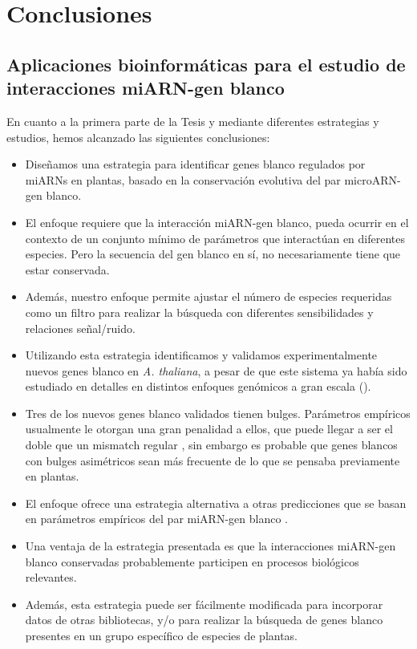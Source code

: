 \setcounter{chapter}{8}
\chapter*{Conclusiones} 
\setcounter{figure}{0}
\setcounter{section}{0}


\graphicspath{{Chapter2/Figs/}}


\section{Aplicaciones bioinformáticas para el estudio de interacciones miARN-gen blanco}

En cuanto a la primera parte de la Tesis y mediante diferentes estrategias y estudios, hemos alcanzado las siguientes conclusiones:

\begin{itemize}
    \item Diseñamos una estrategia para identificar genes blanco regulados por miARNs en plantas, basado en la conservación evolutiva del par microARN-gen blanco.
    \item El enfoque requiere que la interacción miARN-gen blanco, pueda ocurrir en el contexto de un conjunto mínimo de parámetros que interactúan en diferentes especies. Pero la secuencia del gen blanco en sí, no necesariamente tiene que estar conservada.
    \item Además, nuestro enfoque permite ajustar el número de especies requeridas como un filtro para realizar la búsqueda con diferentes sensibilidades y relaciones señal/ruido.
    \item Utilizando esta estrategia identificamos y validamos experimentalmente nuevos genes blanco en \textit{A. thaliana}, a pesar de que este sistema ya había sido estudiado en detalles en distintos enfoques genómicos a gran escala (\citep{Allen2005207,JonesRhoades2004787,Addo-quaye2009a,German2008,Rajagopalan2006,Schwab2005517}).
    \item Tres de los nuevos genes blanco validados tienen bulges. Parámetros empíricos usualmente le otorgan una gran penalidad a ellos, que puede llegar a ser el doble que un mismatch regular \citep{JonesRhoades2004787}, 
    sin embargo es probable que genes blancos con bulges asimétricos sean más frecuente de lo que se pensaba previamente en plantas.
    \item El enfoque ofrece una estrategia alternativa a otras predicciones que se basan en parámetros empíricos del par miARN-gen blanco \citep{Allen2005207,JonesRhoades2004787,citeulike:8816489,Fahlgren_chapter}.
    \item Una ventaja de la estrategia presentada es que la interacciones miARN-gen blanco conservadas probablemente participen en procesos biológicos relevantes.
    \item Además, esta estrategia puede ser fácilmente modificada para incorporar datos de otras bibliotecas, y/o para realizar la búsqueda de genes blanco presentes en un grupo específico de especies de plantas.
\end{itemize}

